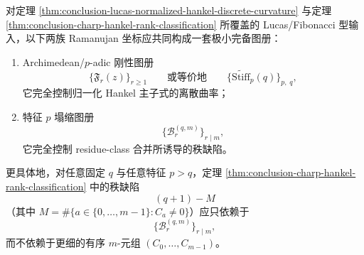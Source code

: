 \begin{conjecture}\label{conj:conclusion-lucas-hankel-minimal-ramanujan-atlas}
对定理 \ref{thm:conclusion-lucas-normalized-hankel-discrete-curvature} 与定理 \ref{thm:conclusion-charp-hankel-rank-classification} 所覆盖的 Lucas/Fibonacci 型输入，以下两族 Ramanujan 坐标应共同构成一套极小完备图册：
\begin{enumerate}
  \item Archimedean/\(p\)-adic 刚性图册
  \[
  \{\mathfrak F_r(z)\}_{r\ge 1}
  \qquad\text{或等价地}\qquad
  \{\widetilde{\mathrm{Stiff}}_p(q)\}_{p,\;q},
  \]
  它完全控制归一化 Hankel 主子式的离散曲率；
  \item 特征 \(p\) 塌缩图册
  \[
  \{\mathcal B_r^{(q,m)}\}_{r\mid m},
  \]
  它完全控制 residue-class 合并所诱导的秩缺陷。
\end{enumerate}
更具体地，对任意固定 \(q\) 与任意特征 \(p>q\)，定理 \ref{thm:conclusion-charp-hankel-rank-classification} 中的秩缺陷
\[
(q+1)-M
\]
（其中 \(M=\#\{a\in\{0,\dots,m-1\}:C_a\neq 0\}\)）应只依赖于
\[
\{\mathcal B_r^{(q,m)}\}_{r\mid m},
\]
而不依赖于更细的有序 \(m\)-元组 \((C_0,\dots,C_{m-1})\)。
\end{conjecture}

\endinput

